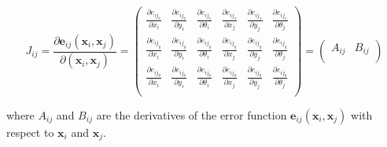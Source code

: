 \documentclass{article}
\begin{document}
\[
J_{ij} =
\frac{\partial \bm{e}_{ij}(\bm{x}_i, \bm{x}_j)}{\partial (\bm{x}_i,\bm{x}_j)} =
\left(
  \begin{array}{cccccc}
    \frac{\partial e_{ij_x}}{\partial x_i} & \frac{\partial e_{ij_x}}{\partial y_i} & \frac{\partial e_{ij_x}}{\partial \theta_i} & \frac{\partial e_{ij_x}}{\partial x_j} & \frac{\partial e_{ij_x}}{\partial y_j} & \frac{\partial e_{ij_x}}{\partial \theta_j} \\
    \frac{\partial e_{ij_y}}{\partial x_i} & \frac{\partial e_{ij_y}}{\partial y_i} & \frac{\partial e_{ij_y}}{\partial \theta_i} & \frac{\partial e_{ij_y}}{\partial x_j} & \frac{\partial e_{ij_y}}{\partial y_j} & \frac{\partial e_{ij_y}}{\partial \theta_j} \\
    \frac{\partial e_{ij_\theta}}{\partial x_i} & \frac{\partial e_{ij_\theta}}{\partial y_i} & \frac{\partial e_{ij_\theta}}{\partial \theta_i} & \frac{\partial e_{ij_\theta}}{\partial x_j} & \frac{\partial e_{ij_\theta}}{\partial y_j} & \frac{\partial e_{ij_\theta}}{\partial \theta_j} \\
  \end{array}
\right) =
\left(
  \begin{array}{cc}
    A_{ij} & B_{ij} \\
  \end{array}
\right)
\]

where $A_{ij}$ and $B_{ij}$ are the derivatives of the error function $\bm{e}_{ij}(\bm{x}_i, \bm{x}_j)$ with respect to $\bm{x}_i$ and $\bm{x}_j$.
\end{document}
